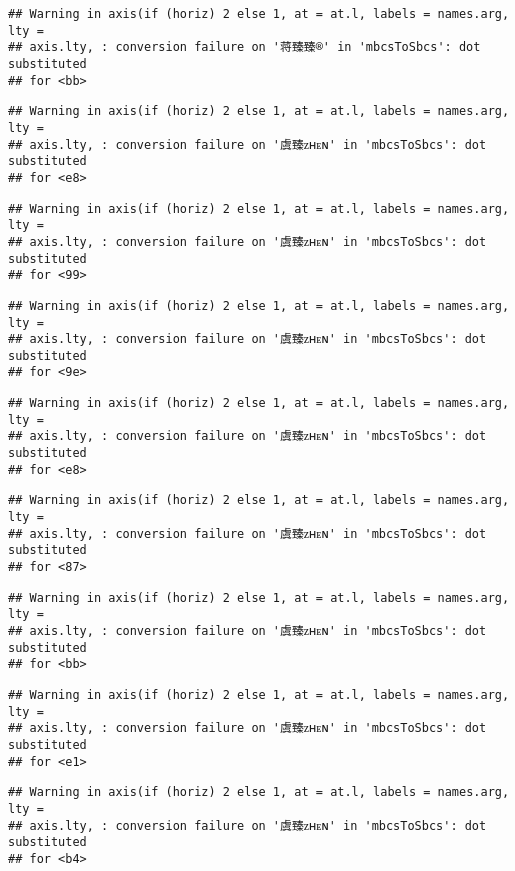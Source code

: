 \documentclass[
]{article}
\begin{document}
\begin{verbatim}
## Warning in axis(if (horiz) 2 else 1, at = at.l, labels = names.arg, lty =
## axis.lty, : conversion failure on '蒋臻臻®' in 'mbcsToSbcs': dot substituted
## for <bb>
\end{verbatim}

\begin{verbatim}
## Warning in axis(if (horiz) 2 else 1, at = at.l, labels = names.arg, lty =
## axis.lty, : conversion failure on '虞臻ᴢʜᴇɴ' in 'mbcsToSbcs': dot substituted
## for <e8>
\end{verbatim}

\begin{verbatim}
## Warning in axis(if (horiz) 2 else 1, at = at.l, labels = names.arg, lty =
## axis.lty, : conversion failure on '虞臻ᴢʜᴇɴ' in 'mbcsToSbcs': dot substituted
## for <99>
\end{verbatim}

\begin{verbatim}
## Warning in axis(if (horiz) 2 else 1, at = at.l, labels = names.arg, lty =
## axis.lty, : conversion failure on '虞臻ᴢʜᴇɴ' in 'mbcsToSbcs': dot substituted
## for <9e>
\end{verbatim}

\begin{verbatim}
## Warning in axis(if (horiz) 2 else 1, at = at.l, labels = names.arg, lty =
## axis.lty, : conversion failure on '虞臻ᴢʜᴇɴ' in 'mbcsToSbcs': dot substituted
## for <e8>
\end{verbatim}

\begin{verbatim}
## Warning in axis(if (horiz) 2 else 1, at = at.l, labels = names.arg, lty =
## axis.lty, : conversion failure on '虞臻ᴢʜᴇɴ' in 'mbcsToSbcs': dot substituted
## for <87>
\end{verbatim}

\begin{verbatim}
## Warning in axis(if (horiz) 2 else 1, at = at.l, labels = names.arg, lty =
## axis.lty, : conversion failure on '虞臻ᴢʜᴇɴ' in 'mbcsToSbcs': dot substituted
## for <bb>
\end{verbatim}

\begin{verbatim}
## Warning in axis(if (horiz) 2 else 1, at = at.l, labels = names.arg, lty =
## axis.lty, : conversion failure on '虞臻ᴢʜᴇɴ' in 'mbcsToSbcs': dot substituted
## for <e1>
\end{verbatim}

\begin{verbatim}
## Warning in axis(if (horiz) 2 else 1, at = at.l, labels = names.arg, lty =
## axis.lty, : conversion failure on '虞臻ᴢʜᴇɴ' in 'mbcsToSbcs': dot substituted
## for <b4>
\end{verbatim}
\end{document}
